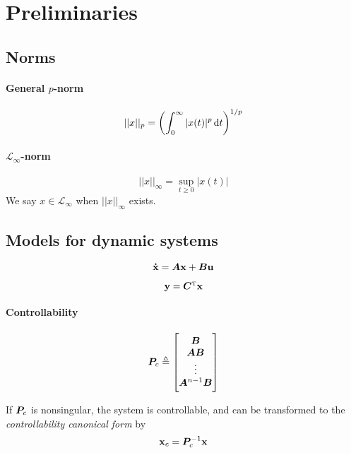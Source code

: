 \section{Preliminaries}
\subsection{Norms}
\paragraph{General $p$-norm}
\begin{equation}
	||x||_p
	=
	\left(
		\int_{0}^{\infty} |x(t)|^p \dif t
	\right)
	^{1/p}
\end{equation}

\paragraph{$\mathcal{L}_\infty$-norm}
\begin{equation}
	||x||_\infty
	=
	\sup_{t \geq 0} |x(t)|
\end{equation}
We say $x \in \mathcal{L}_\infty$ when $||x||_\infty$ exists.

\subsection{Models for dynamic systems}

\begin{equation}
	\boldsymbol{\mathbf{\dot{x}}}
	=
	\bm{A} \boldsymbol{\mathbf{x}}
	+
	\bm{B} \boldsymbol{\mathbf{u}}
\end{equation}

\begin{equation}
	\boldsymbol{\mathbf{y}}
	=
	\bm{C}^{\scriptscriptstyle \mathrm{T}} \boldsymbol{\mathbf{x}}
\end{equation}

\paragraph{Controllability}
\begin{equation}
	\bm{P}_c
	\triangleq
	\begin{bmatrix}
		\bm{B} \\ \bm{AB} \\ \vdots \\ \bm{A}^{n-1}\bm{B}
	\end{bmatrix}
\end{equation}

If $\bm{P}_c$ is nonsingular, the system is controllable, and can be transformed to the \emph{controllability canonical form} by
\begin{equation}
	\boldsymbol{\mathbf{x}}_c
	=
	\bm{P}_c^{-1} \boldsymbol{\mathbf{x}}
\end{equation}

